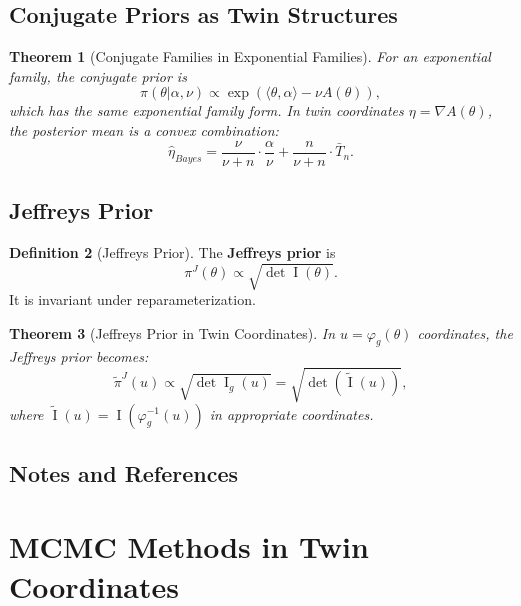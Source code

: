 \documentclass[11pt,twoside]{book}
\theoremstyle{plain}
\newtheorem{theorem}{Theorem}[chapter]
\theoremstyle{definition}
\newtheorem{definition}[theorem]{Definition}
\theoremstyle{remark}
\DeclareMathOperator{\Fisher}{I}
\begin{document}
\section{Conjugate Priors as Twin Structures}
\label{sec:conjugate}

\begin{theorem}[Conjugate Families in Exponential Families]
    For an exponential family, the conjugate prior is
    \[
    \pi(\theta | \alpha, \nu) \propto \exp(\langle \theta, \alpha \rangle - \nu A(\theta)),
    \]
    which has the same exponential family form. In twin coordinates $\eta = \nabla A(\theta)$, the posterior mean is a convex combination:
    \[
    \hat{\eta}_{Bayes} = \frac{\nu}{\nu + n} \cdot \frac{\alpha}{\nu} + \frac{n}{\nu + n} \cdot \bar{T}_n.
    \]
\end{theorem}

\section{Jeffreys Prior}
\label{sec:jeffreys}

\begin{definition}[Jeffreys Prior]
    The \textbf{Jeffreys prior} is
    \[
    \pi^J(\theta) \propto \sqrt{\det \Fisher(\theta)}.
    \]
    It is invariant under reparameterization.
\end{definition}

\begin{theorem}[Jeffreys Prior in Twin Coordinates]
    In $u = \varphi_g(\theta)$ coordinates, the Jeffreys prior becomes:
    \[
    \tilde{\pi}^J(u) \propto \sqrt{\det \Fisher_g(u)} = \sqrt{\det(\tilde{\Fisher}(u))},
    \]
    where $\tilde{\Fisher}(u) = \Fisher(\varphi_g^{-1}(u))$ in appropriate coordinates.
\end{theorem}

\section{Notes and References}
\label{sec:ch8_notes}


\chapter{MCMC Methods in Twin Coordinates}
\label{ch:mcmc}
\end{document}
